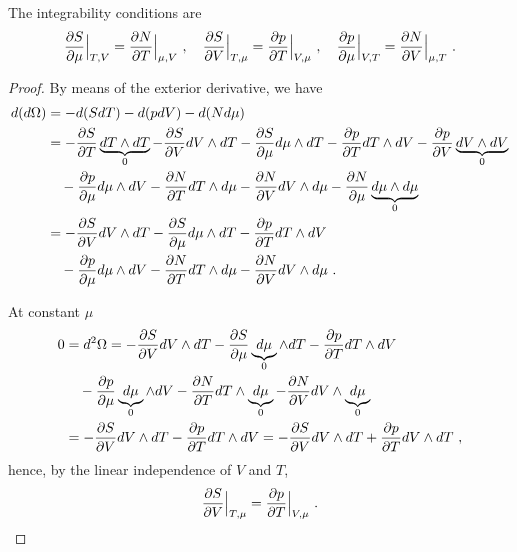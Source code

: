     The integrability conditions are 
    \begin{equation}\label{td:int:o}
        \frac{\partial S}{\partial\mu} \Big \vert_{T,V} = \frac{\partial N}{\partial T} \Big \vert_{\mu,V} ~, \quad 
        \frac{\partial S}{\partial V} \Big \vert_{T,\mu} = \frac{\partial p}{\partial T} \Big \vert_{V, \mu} ~, \quad 
        \frac{\partial p}{\partial\mu} \Big \vert_{V,T} = \frac{\partial N}{\partial V} \Big \vert_{\mu, T} ~. 
    \end{equation}
    \begin{proof}
        By means of the exterior derivative, we have 
        \begin{equation*}
        \begin{aligned}
            d (d\Omega) & = - d (S dT) - d (p dV) - d (N d\mu) \\ & = - \frac{\partial S}{\partial T} \underbrace{dT \wedge dT}_0 - \frac{\partial S}{\partial V} dV \wedge dT - \frac{\partial S}{\partial\mu} d\mu \wedge dT - \frac{\partial p}{\partial T} dT \wedge dV - \frac{\partial p}{\partial V} \underbrace{dV \wedge dV}_0 \\ & \quad - \frac{\partial p}{\partial\mu} d\mu \wedge dV - \frac{\partial N}{\partial T} dT \wedge d\mu - \frac{\partial N}{\partial V} dV \wedge d\mu - \frac{\partial N}{\partial\mu} \underbrace{d\mu \wedge d\mu}_0 \\ & = - \frac{\partial S}{\partial V} dV \wedge dT - \frac{\partial S}{\partial\mu} d\mu \wedge dT - \frac{\partial p}{\partial T} dT \wedge dV \\ & \quad - \frac{\partial p}{\partial\mu} d\mu \wedge dV - \frac{\partial N}{\partial T} dT \wedge d\mu - \frac{\partial N}{\partial V} dV \wedge d\mu ~.
        \end{aligned}
        \end{equation*}

        At constant $\mu$ 
        \begin{equation*}
        \begin{aligned}
            0 & = d^2 \Omega = - \frac{\partial S}{\partial V} dV \wedge dT - \frac{\partial S}{\partial\mu} \underbrace{d\mu}_0 \wedge dT - \frac{\partial p}{\partial T} dT \wedge dV \\ & \quad - \frac{\partial p}{\partial\mu} \underbrace{d\mu}_0 \wedge dV - \frac{\partial N}{\partial T} dT \wedge \underbrace{d\mu}_0 - \frac{\partial N}{\partial V} dV \wedge \underbrace{d\mu}_0 \\ & = - \frac{\partial S}{\partial V} dV \wedge dT - \frac{\partial p}{\partial T} dT \wedge dV = - \frac{\partial S}{\partial V} dV \wedge dT + \frac{\partial p}{\partial T} dV \wedge dT ~,
        \end{aligned}
        \end{equation*}
        hence, by the linear independence of $V$ and $T$,
        \begin{equation*}
            \frac{\partial S}{\partial V} \Big \vert_{T,\mu} = \frac{\partial p}{\partial T} \Big \vert_{V, \mu} ~.
        \end{equation*}


\end{proof}
